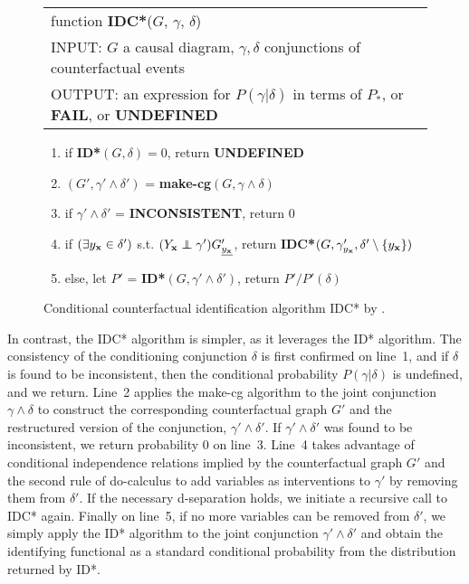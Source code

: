 \begin{figure}[ht]
\begin{center}
  \begin{tabular}{l}
    function \textbf{IDC*}(\(G\), \(\gamma\), \(\delta\)) \\
    INPUT: \(G\) a causal diagram, \(\gamma, \delta\) conjunctions of counterfactual events\\
    OUTPUT: an expression for \(P(\gamma|\delta)\) in terms of \(P_*\), or \textbf{FAIL}, or \textbf{UNDEFINED}
  \end{tabular}
  \begin{minipage}{.80\textwidth}
  \vspace*{0.25cm}
  \begin{enumerate}
    \item if \textbf{ID*}\((G, \delta) = 0\), return \textbf{UNDEFINED}
    \item \((G', \gamma' \wedge \delta')\) = \textbf{make-cg}\((G, \gamma \wedge \delta)\)
    \item if \(\gamma' \wedge \delta'\) = \textbf{INCONSISTENT}, return \(0\)
    \item if \((\exists y_{\mathbf{x}} \in \delta')\) s.t. \((Y_\+{x} \independent \gamma') G'_{\underline{y_{\+{x}}}}\), return \textbf{IDC*}\((G,\gamma'_{y_{\mathbf{x}}}, \delta' \setminus \{y_{\mathbf{x}}\})\)
    \item else, let \(P'\) = \textbf{ID*}\((G, \gamma' \wedge \delta')\), return \(P'/P'(\delta)\)
  \end{enumerate}
  \end{minipage}
\end{center}
\caption{Conditional counterfactual identification algorithm IDC* by \citet{shpitser2007}.}
\label{fig:idcstaralgo}
\end{figure}

In contrast, the IDC* algorithm is simpler, as it leverages the ID* algorithm. The consistency of the conditioning conjunction \(\delta\) is first confirmed on line~1, and if \(\delta\) is found to be inconsistent, then the conditional probability \(P(\gamma|\delta)\) is undefined, and we return. Line~2 applies the make-cg algorithm to the joint conjunction \(\gamma \wedge \delta\) to construct the corresponding counterfactual graph \(G'\) and the restructured version of the conjunction, \(\gamma' \wedge \delta'\). If \(\gamma' \wedge \delta'\) was found to be inconsistent, we return probability 0 on line~3. Line~4 takes advantage of conditional independence relations implied by the counterfactual graph \(G'\) and the second rule of do-calculus to add variables as interventions to \(\gamma'\) by removing them from \(\delta'\). If the necessary d-separation holds, we initiate a recursive call to IDC* again. Finally on line~5, if no more variables can be removed from \(\delta'\), we simply apply the ID* algorithm to the joint conjunction \(\gamma' \wedge \delta'\) and obtain the identifying functional as a standard conditional probability from the distribution returned by ID*.

